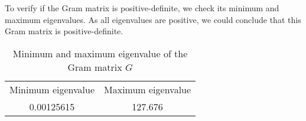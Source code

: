 To verify if the Gram matrix is positive-definite, we check its minimum and maximum eigenvalues.
As all eigenvalues are positive, we could conclude that this Gram matrix is positive-definite.

\begin{table} 
    \begin{tabular}{ c c  }
        Minimum eigenvalue & Maximum eigenvalue \\
        0.00125615 & 127.676 \\ 
    \end{tabular} 
    \caption{Minimum and maximum eigenvalue of the Gram matrix $G$} 
\end{table}
